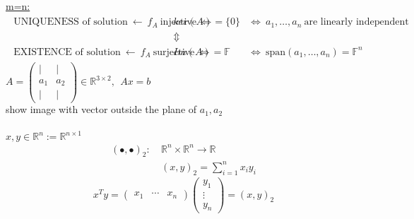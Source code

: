 \begin{frame}
	~\\
	{\blank
		\underline{m=n:}
		\begin{align*}
		\begin{array}{rcl}
		\text{UNIQUENESS of solution}~\leftarrow~f_A~\text{injective}~\Leftrightarrow&ker(A)=\{0\}&\Leftrightarrow~a_1,\dots,a_n~\text{are linearly independent}\\
		~&\Updownarrow&~\\
		\text{EXISTENCE of solution}~\leftarrow~f_A~\text{surjective}~\Leftrightarrow&Im(A)=\mathbb{F}&\Leftrightarrow~\text{span}(a_1,\dots,a_n)=\mathbb{F}^n
		\end{array}
		\end{align*}
		$A=\begin{pmatrix}|&|\\a_1&a_2\\|&|\end{pmatrix}\in\mathbb{R}^{3\times 2},~~Ax=b$\\
		show image with vector outside the plane of $a_1,a_2$\\
		~\\
		$x,y\in\mathbb{R}^n:=\mathbb{R}^{n\times 1}$\\
		\begin{align*}
		(\bullet,\bullet)_2:~&\mathbb{R}^n\times\mathbb{R}^n\rightarrow\mathbb{R}\\
		&(x,y)_2=\sum_{i=1}^{n}x_iy_i
		\end{align*}
		$$ x^Ty=\begin{pmatrix}x_1&\cdots&x_n\end{pmatrix}\begin{pmatrix}y_1\\\vdots\\y_n\end{pmatrix}=(x,y)_2 $$
	}
\end{frame}
